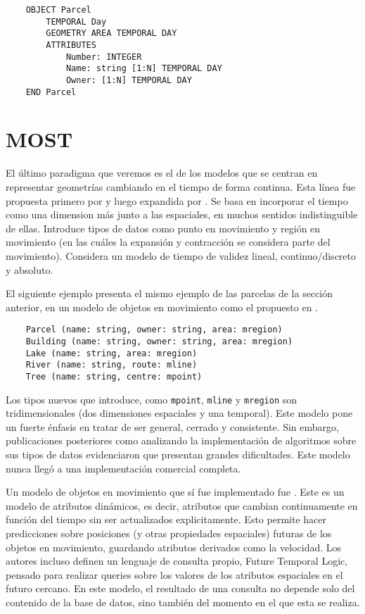 \begin{verbatim}
    OBJECT Parcel
        TEMPORAL Day
        GEOMETRY AREA TEMPORAL DAY
        ATTRIBUTES
            Number: INTEGER
            Name: string [1:N] TEMPORAL DAY
            Owner: [1:N] TEMPORAL DAY
    END Parcel
\end{verbatim}


\section{MOST}

El último paradigma que veremos es el de los modelos que se centran en representar geometrías cambiando en el tiempo de forma continua. Esta línea fue propuesta primero por \cite{sp:moving} y luego expandida por \cite{sp:moving2}. Se basa en incorporar el tiempo como una dimension más junto a las espaciales, en muchos sentidos indistinguible de ellas.
Introduce tipos de datos como punto en movimiento y región en movimiento (en las cuáles la expansión y contracción se considera parte del movimiento). Considera un modelo de tiempo de validez lineal, continuo/discreto y absoluto.

El siguiente ejemplo presenta el mismo ejemplo de las parcelas de la sección anterior, en un modelo de objetos en movimiento como el propuesto en \cite{sp:moving2}.

\begin{verbatim}
    Parcel (name: string, owner: string, area: mregion)
    Building (name: string, owner: string, area: mregion)
    Lake (name: string, area: mregion)
    River (name: string, route: mline)
    Tree (name: string, centre: mpoint)
\end{verbatim}

Los tipos nuevos que introduce, como \texttt{mpoint}, \texttt{mline} y \texttt{mregion} son tridimensionales (dos dimensiones espaciales y una temporal). Este modelo pone un fuerte énfasis en tratar de ser general, cerrado y consistente. Sin embargo, publicaciones posteriores como \cite{sp:moving3} analizando la implementación de algoritmos sobre sus tipos de datos evidenciaron que presentan grandes dificultades. Este modelo nunca llegó a una implementación comercial completa.

Un modelo de objetos en movimiento que sí fue implementado fue \textsuperscript{\cite{sp:most}}. Este es un modelo de atributos dinámicos, es decir, atributos que cambian continuamente en función del tiempo sin ser actualizados explicitamente. Esto permite hacer predicciones sobre posiciones (y otras propiedades espaciales) futuras de los objetos en movimiento, guardando atributos derivados como la velocidad. Los autores incluso definen un lenguaje de consulta propio, Future Temporal Logic, pensado para realizar queries sobre los valores de los atributos espaciales en el futuro cercano.
En este modelo, el resultado de una consulta no depende solo del contenido de la base de datos, sino también del momento en el que esta se realiza.

